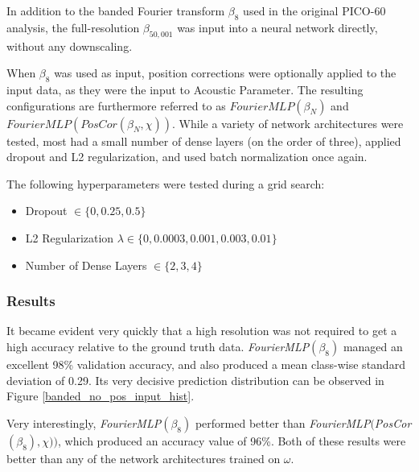 \documentclass[10pt]{article}
\begin{document}
In addition to the banded Fourier transform $\beta_{8}$ used in the original PICO-60 analysis, the full-resolution $\beta _{50,001}$ was input into a neural network directly, without any downscaling.

When $\beta_{8}$ was used as input, position corrections were optionally applied to the input data, as they were the input to Acoustic Parameter. The resulting configurations are furthermore referred to as $FourierMLP(\beta_{N})$ and $FourierMLP(PosCor(\beta_{N}, \chi))$. While a variety of network architectures were tested, most had a small number of dense layers (on the order of three), applied dropout and L2 regularization, and used batch normalization once again.

The following hyperparameters were tested during a grid search:
\begin{itemize}
    \item Dropout $\in \{0, 0.25, 0.5\}$
    \item L2 Regularization $\lambda \in \{0, 0.0003, 0.001, 0.003, 0.01\}$
    \item Number of Dense Layers $\in \{2, 3, 4\}$
\end{itemize}

\subsubsection{Results}

It became evident very quickly that a high resolution was not required to get a high accuracy relative to the ground truth data. {\it FourierMLP}$(\beta_{8})$ managed an excellent 98\% validation accuracy, and also produced a mean class-wise standard deviation of 0.29. Its very decisive prediction distribution can be observed in Figure \ref{banded_no_pos_input_hist}.

Very interestingly, {\it FourierMLP}$(\beta_{8})$ performed better than {\it FourierMLP}$(${\it PosCor}$(\beta_{8}), \chi))$, which produced an accuracy value of 96\%. Both of these results were better than any of the network architectures trained on $\omega$.
\end{document}
